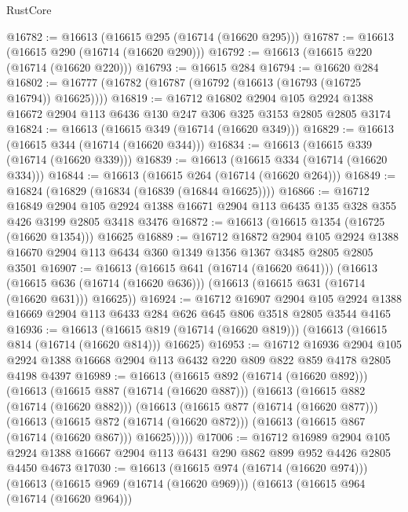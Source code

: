 \begin{lexlean}{RustCore}
\begin{coremodule}
@16782 := @16613 (@16615 @295 (@16714 (@16620 @295)))
@16787 := @16613 (@16615 @290 (@16714 (@16620 @290)))
@16792 := @16613 (@16615 @220 (@16714 (@16620 @220)))
@16793 := @16615 @284
@16794 := @16620 @284
@16802 := @16777 (@16782 (@16787 (@16792 (@16613 (@16793 (@16725 @16794)) @16625))))
@16819 := @16712
    @16802
    @2904
    @105
    @2924
    @1388
    @16672
    @2904
    @113
    @6436
    @130
    @247
    @306
    @325
    @3153
    @2805
    @2805
    @3174
@16824 := @16613 (@16615 @349 (@16714 (@16620 @349)))
@16829 := @16613 (@16615 @344 (@16714 (@16620 @344)))
@16834 := @16613 (@16615 @339 (@16714 (@16620 @339)))
@16839 := @16613 (@16615 @334 (@16714 (@16620 @334)))
@16844 := @16613 (@16615 @264 (@16714 (@16620 @264)))
@16849 := @16824 (@16829 (@16834 (@16839 (@16844 @16625))))
@16866 := @16712
    @16849
    @2904
    @105
    @2924
    @1388
    @16671
    @2904
    @113
    @6435
    @135
    @328
    @355
    @426
    @3199
    @2805
    @3418
    @3476
@16872 := @16613 (@16615 @1354 (@16725 (@16620 @1354))) @16625
@16889 := @16712
    @16872
    @2904
    @105
    @2924
    @1388
    @16670
    @2904
    @113
    @6434
    @360
    @1349
    @1356
    @1367
    @3485
    @2805
    @2805
    @3501
@16907 := @16613
    (@16615 @641 (@16714 (@16620 @641)))
    (@16613
      (@16615 @636 (@16714 (@16620 @636)))
      (@16613 (@16615 @631 (@16714 (@16620 @631))) @16625))
@16924 := @16712
    @16907
    @2904
    @105
    @2924
    @1388
    @16669
    @2904
    @113
    @6433
    @284
    @626
    @645
    @806
    @3518
    @2805
    @3544
    @4165
@16936 := @16613
    (@16615 @819 (@16714 (@16620 @819)))
    (@16613 (@16615 @814 (@16714 (@16620 @814))) @16625)
@16953 := @16712
    @16936
    @2904
    @105
    @2924
    @1388
    @16668
    @2904
    @113
    @6432
    @220
    @809
    @822
    @859
    @4178
    @2805
    @4198
    @4397
@16989 := @16613
    (@16615 @892 (@16714 (@16620 @892)))
    (@16613
      (@16615 @887 (@16714 (@16620 @887)))
      (@16613
        (@16615 @882 (@16714 (@16620 @882)))
        (@16613
          (@16615 @877 (@16714 (@16620 @877)))
          (@16613
            (@16615 @872 (@16714 (@16620 @872)))
            (@16613 (@16615 @867 (@16714 (@16620 @867))) @16625)))))
@17006 := @16712
    @16989
    @2904
    @105
    @2924
    @1388
    @16667
    @2904
    @113
    @6431
    @290
    @862
    @899
    @952
    @4426
    @2805
    @4450
    @4673
@17030 := @16613
    (@16615 @974 (@16714 (@16620 @974)))
    (@16613
      (@16615 @969 (@16714 (@16620 @969)))
      (@16613
        (@16615 @964 (@16714 (@16620 @964)))

\end{coremodule}
\end{lexlean}
